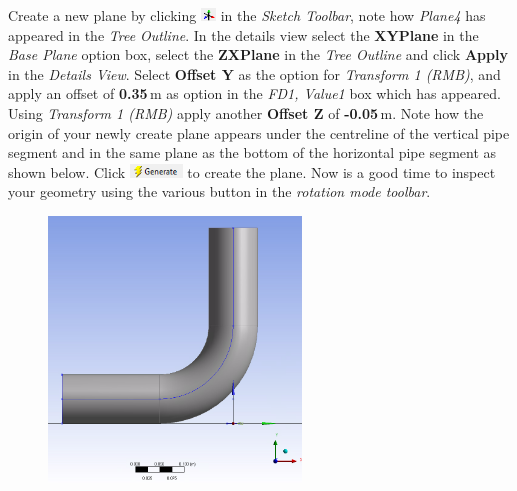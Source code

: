 \documentclass[12pts,a4paper,amsmath,amssymb,floatfix]{article}%
\newcommand\bfr[1]{\textcolor[rgb]{1,0.00,0.00}{\textbf{\textsf{#1}}}}
\begin{document}
\bigskip
Create a new plane by clicking \includegraphics[width=0.4cm]{./Pics/new_plane.png} in the \emph{Sketch Toolbar}, note how \emph{Plane4} has appeared in the \emph{Tree Outline}. In the details view select the \bfr{XYPlane} in the \emph{Base Plane} option box, select the \bfr{ZXPlane} in the \emph{Tree Outline} and click \bfr{Apply} in the \emph{Details View}. Select \bfr{Offset Y} as the option for \emph{Transform 1 (RMB)}, and apply an offset of \bfr{0.35}\,m as option in the \emph{FD1, Value1} box which has appeared. Using \emph{Transform 1 (RMB)} apply another \bfr{Offset Z} of \bfr{-0.05}\,m. Note how the origin of your newly create plane appears under the centreline of the vertical pipe segment and in the same plane as the bottom of the horizontal pipe segment as shown below. Click \includegraphics[width=1.4cm]{./Pics/generate_button.png} to create the plane. Now is a good time to inspect your geometry using the various button in the \emph{rotation mode toolbar}.
\begin{figure}[H]
\begin{center}
\includegraphics[width=0.6\textwidth,clip]{./Pics/new_plane_origin.png}
\end{center}
\end{figure}
\end{document}
